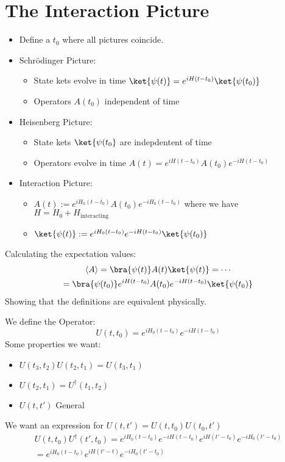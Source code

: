 \documentclass[]{scrartcl}
\begin{document}
\section{The Interaction Picture}
\begin{itemize}
	\item Define a $t_0$ where all pictures coincide.
	\item Schrödinger Picture:
		\begin{itemize}
			\item State kets evolve in time $\ket{\psi(t)} = e^{iH(t-t_0)}\ket{\psi(t_0)}$
			\item Operators $A(t_0)$ independent of time
		\end{itemize}
	\item Heisenberg Picture:
		\begin{itemize}
			\item State kets $\ket{\psi(t_0}$ are indepdentent of time
			\item Operators evolve in time $A(t) = e^{iH(t-t_0)}A(t_0)e^{-iH(t-t_0)}$
		\end{itemize}
	\item Interaction Picture:
		\begin{itemize}
			\item $A(t) := e^{iH_0(t-t_0)}A(t_0)e^{-iH_0(t-t_0)}$ where we have $H = H_0 + H_{\text{interacting}}$
			\item $\ket{\psi(t)} := e^{iH_0(t-t_0)}e^{-iH(t-t_0)}\ket{\psi(t_0)}$
		\end{itemize}
\end{itemize}

Calculating the expectation values:
\begin{gather}
	\langle A \rangle = \bra{\psi(t)} A(t) \ket{\psi(t)} = \cdots \\
	= \bra{\psi(t_0)} e^{iH(t-t_0)} A(t_0) e^{-iH(t-t_0)}\ket{\psi(t_0)}
\end{gather}
Showing that the definitions are equivalent physically.

We define the Operator:
$$
U(t,t_0) = e^{iH_0(t-t_0)}e^{-iH(t-t_0)}
$$
Some properties we want:
\begin{itemize}
	\item $U(t_3,t_2)U(t_2,t_1) = U(t_3,t_1)$
	\item $U(t_2,t_1) = U^\dagger(t_1,t_2)$
	\item $U(t,t')$ General
\end{itemize}

We want an expression for $U(t,t') = U(t,t_0) U(t_0,t')$
\begin{gather}
	U(t,t_0)U^\dagger(t',t_0) = e^{iH_0(t-t_0)}e^{-iH(t-t_0)}e^{iH(t'-t_0)}e^{-iH_0(t'-t_0)}\\
	= e^{iH_0(t-t_0)}e^{iH(t'-t)}e^{-iH_0(t'-t_0)}
\end{gather}
\end{document}
